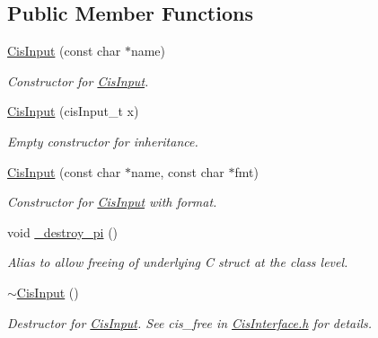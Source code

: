 \subsection*{Public Member Functions}
\begin{DoxyCompactItemize}
\item 
\mbox{\hyperlink{classCisInput_a5a81811ecb4ea9b3d786ea60522cdcb7}{Cis\+Input}} (const char $\ast$name)
\begin{DoxyCompactList}\small\item\em Constructor for \mbox{\hyperlink{classCisInput}{Cis\+Input}}. \end{DoxyCompactList}\item 
\mbox{\label{classCisInput_a9e6a005bec40db9eacc4bd7c8051c112}} 
\mbox{\hyperlink{classCisInput_a9e6a005bec40db9eacc4bd7c8051c112}{Cis\+Input}} (cis\+Input\+\_\+t x)
\begin{DoxyCompactList}\small\item\em Empty constructor for inheritance. \end{DoxyCompactList}\item 
\mbox{\hyperlink{classCisInput_ad39b94867de8741606bef7f1acdcbfd2}{Cis\+Input}} (const char $\ast$name, const char $\ast$fmt)
\begin{DoxyCompactList}\small\item\em Constructor for \mbox{\hyperlink{classCisInput}{Cis\+Input}} with format. \end{DoxyCompactList}\item 
\mbox{\label{classCisInput_af098d058831c5aeb24c785daf322d0d3}} 
void \mbox{\hyperlink{classCisInput_af098d058831c5aeb24c785daf322d0d3}{\+\_\+destroy\+\_\+pi}} ()
\begin{DoxyCompactList}\small\item\em Alias to allow freeing of underlying C struct at the class level. \end{DoxyCompactList}\item 
\mbox{\label{classCisInput_a66ff037c37e380abd82e107980f0af44}} 
\mbox{\hyperlink{classCisInput_a66ff037c37e380abd82e107980f0af44}{$\sim$\+Cis\+Input}} ()
\begin{DoxyCompactList}\small\item\em Destructor for \mbox{\hyperlink{classCisInput}{Cis\+Input}}. See cis\+\_\+free in \mbox{\hyperlink{CisInterface_8h_source}{Cis\+Interface.\+h}} for details. \end{DoxyCompactList}\item 

\end{DoxyCompactItemize}
